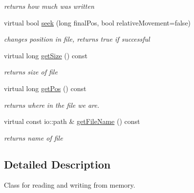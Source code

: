 \begin{DoxyCompactItemize}
\begin{DoxyCompactList}\small\item\em returns how much was written \end{DoxyCompactList}\item 
virtual bool \hyperlink{classirr_1_1io_1_1_c_memory_file_a5fce33ee67fa4655abd03e198f07abda}{seek} (long final\-Pos, bool relative\-Movement=false)
\begin{DoxyCompactList}\small\item\em changes position in file, returns true if successful \end{DoxyCompactList}\item 
\hypertarget{classirr_1_1io_1_1_c_memory_file_aaef8dad8e25866fedd88e8e856db083f}{virtual long \hyperlink{classirr_1_1io_1_1_c_memory_file_aaef8dad8e25866fedd88e8e856db083f}{get\-Size} () const }\label{classirr_1_1io_1_1_c_memory_file_aaef8dad8e25866fedd88e8e856db083f}

\begin{DoxyCompactList}\small\item\em returns size of file \end{DoxyCompactList}\item 
\hypertarget{classirr_1_1io_1_1_c_memory_file_ab84f511ede304b982d3aad5647d0f676}{virtual long \hyperlink{classirr_1_1io_1_1_c_memory_file_ab84f511ede304b982d3aad5647d0f676}{get\-Pos} () const }\label{classirr_1_1io_1_1_c_memory_file_ab84f511ede304b982d3aad5647d0f676}

\begin{DoxyCompactList}\small\item\em returns where in the file we are. \end{DoxyCompactList}\item 
\hypertarget{classirr_1_1io_1_1_c_memory_file_a8e0ec707734c186c7ca083df1fecbac1}{virtual const io\-::path \& \hyperlink{classirr_1_1io_1_1_c_memory_file_a8e0ec707734c186c7ca083df1fecbac1}{get\-File\-Name} () const }\label{classirr_1_1io_1_1_c_memory_file_a8e0ec707734c186c7ca083df1fecbac1}

\begin{DoxyCompactList}\small\item\em returns name of file \end{DoxyCompactList}\end{DoxyCompactItemize}


\subsection{Detailed Description}
Class for reading and writing from memory. 

